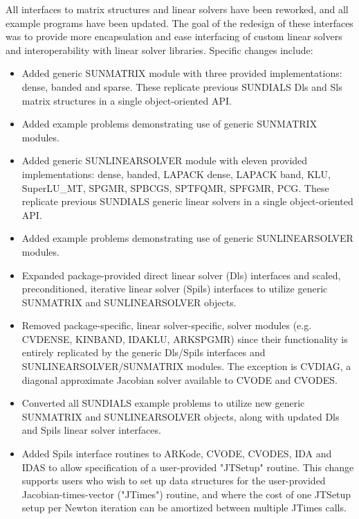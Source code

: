 All interfaces to matrix structures and linear solvers 
have been reworked, and all example programs have been updated. 
The goal of the redesign of these interfaces was to provide more encapsulation
and ease interfacing of custom linear solvers and interoperability 
with linear solver libraries.
Specific changes include:
\begin{itemize}
\item Added generic SUNMATRIX module with three provided implementations:
        dense, banded and sparse.  These replicate previous SUNDIALS Dls and
        Sls matrix structures in a single object-oriented API.
\item Added example problems demonstrating use of generic SUNMATRIX modules.
\item Added generic SUNLINEARSOLVER module with eleven provided
        implementations: dense, banded, LAPACK dense, LAPACK band, KLU,
        SuperLU\_MT, SPGMR, SPBCGS, SPTFQMR, SPFGMR, PCG.  These replicate
        previous SUNDIALS generic linear solvers in a single object-oriented
        API.
\item Added example problems demonstrating use of generic SUNLINEARSOLVER
        modules.
\item Expanded package-provided direct linear solver (Dls) interfaces and
        scaled, preconditioned, iterative linear solver (Spils) interfaces
        to utilize generic SUNMATRIX and SUNLINEARSOLVER objects.
\item Removed package-specific, linear solver-specific, solver modules
        (e.g. CVDENSE, KINBAND, IDAKLU, ARKSPGMR) since their functionality
        is entirely replicated by the generic Dls/Spils interfaces and
        SUNLINEARSOLVER/SUNMATRIX modules.  The exception is CVDIAG, a
        diagonal approximate Jacobian solver available to CVODE and CVODES.
\item Converted all SUNDIALS example problems to utilize new generic
        SUNMATRIX and SUNLINEARSOLVER objects, along with updated Dls and
        Spils linear solver interfaces.
\item Added Spils interface routines to ARKode, CVODE, CVODES, IDA and
        IDAS to allow specification of a user-provided "JTSetup" routine.
        This change supports users who wish to set up data structures for
        the user-provided Jacobian-times-vector ("JTimes") routine, and
        where the cost of one JTSetup setup per Newton iteration can be
        amortized between multiple JTimes calls.
\end{itemize}

